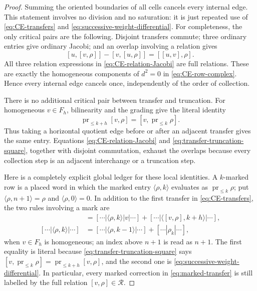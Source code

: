 \documentclass[11pt]{amsart}
\theoremstyle{remark}
\newcommand{\Rel}{\mathcal R}
\newcommand{\pr}{\operatorname{pr}}
\begin{document}
\begin{proof}
Summing the oriented boundaries of all cells cancels every internal
edge.  This statement involves no division and no saturation: it is
just repeated use of \eqref{eq:CE-transfers} and
\eqref{eq:successive-weight-differential}.  For completeness, the only
critical pairs are the following.  Disjoint transfers commute; three
ordinary entries give ordinary Jacobi; and an overlap involving a
relation gives
\begin{equation}\label{eq:CE-relation-Jacobi}
 [u,[v,\rho]]-[v,[u,\rho]]=[[u,v],\rho].
\end{equation}
All three relation expressions in \eqref{eq:CE-relation-Jacobi} are full
relations.  These are exactly the homogeneous components of $d^2=0$ in
\eqref{eq:CE-row-complex}.  Hence every internal edge cancels once,
independently of the order of collection.

	There is no additional critical pair between transfer and truncation.
	For homogeneous $v\in F_h$, bilinearity and the grading give the literal
	identity
\begin{equation}\label{eq:transfer-truncation-square}
 \pr_{\leq k+h}[v,\rho]=[v,\pr_{\leq k}\rho].
\end{equation}
Thus taking a horizontal quotient edge before or after an adjacent
transfer gives the same entry.  Equations
\eqref{eq:CE-relation-Jacobi} and
	\eqref{eq:transfer-truncation-square}, together with disjoint
	commutation, exhaust the overlaps because every collection step is an
	adjacent interchange or a truncation step.

	Here is a completely explicit global ledger for these local identities.
	A $k$-marked row is a placed word in which the marked entry
	$\langle\rho,k\rangle$ evaluates as $\pr_{\leq k}\rho$; put
	$\langle\rho,n+1\rangle=\rho$ and
	$\langle\rho,0\rangle=0$.  In addition to the first transfer in
	\eqref{eq:CE-transfers}, the two rules involving a mark are
	\begin{align}
	 [\cdots|v|\langle\rho,k\rangle|\cdots]
	 &=[\cdots|\langle\rho,k\rangle|v|\cdots]
	   +[\cdots|\langle[v,\rho],k+h\rangle|\cdots],
	                                                        \label{eq:marked-transfer}\\
	 [\cdots|\langle\rho,k\rangle|\cdots]
	 &=[\cdots|\langle\rho,k-1\rangle|\cdots]
	   +[\cdots|\rho_k|\cdots],
	                                                        \label{eq:marked-truncation}
	\end{align}
	when $v\in F_h$ is homogeneous; an index above $n+1$ is read as
	$n+1$.  The first equality is literal because
	\eqref{eq:transfer-truncation-square} says
	$[v,\pr_{\leq k}\rho]=\pr_{\leq k+h}[v,\rho]$, and the second one is
	\eqref{eq:successive-weight-differential}.  In particular, every
	marked correction in \eqref{eq:marked-transfer} is still labelled by
	the full relation $[v,\rho]\in\Rel$.


\end{proof}
\end{document}
